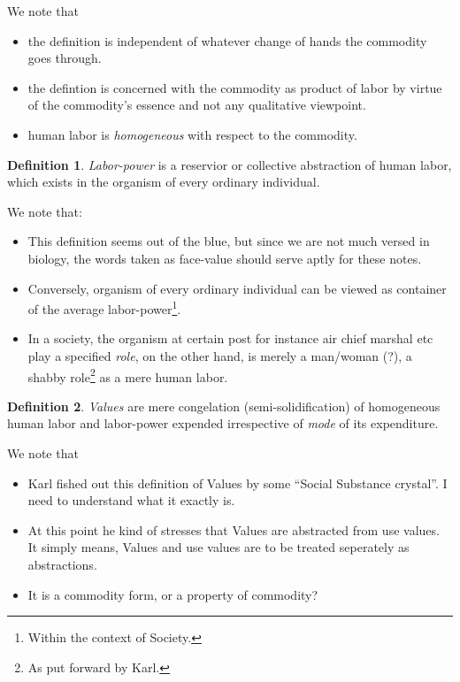 \documentclass[12pt]{extarticle}
\theoremstyle{definition}
\newtheorem{definition}{Definition}[section]
\newenvironment{remark}[1][Remark]{\begin{trivlist}
\item[\hskip \labelsep {\bfseries #1}]}{\end{trivlist}}
\begin{document}
        \begin{remark}
        We note that
        \begin{itemize}
        \item the definition is independent of whatever change of hands the commodity goes through.
        \item the defintion is concerned with the commodity as product of labor by virtue of the commodity's essence and not any qualitative viewpoint.
        \item human labor is \emph{homogeneous} with respect to the commodity.
        \end{itemize}
      \end{remark}

      \begin{definition}
        \label{def:labpow}
        \emph{Labor-power} is a reservior or collective abstraction of human labor, which exists in the organism of every ordinary individual.
      \end{definition}
      \begin{remark}
        We note that:
        \begin{itemize}
        \item This definition seems out of the blue, but since we are not much versed in biology, the words taken as face-value should serve aptly for these notes.
        \item Conversely, organism of every ordinary individual can be viewed as container of the average labor-power\footnote{Within the context of Society.}.
          \item In a society, the organism at certain post for instance air chief marshal etc play a specified \emph{role}, on the other hand, is merely a man/woman (?), a shabby role\footnote{As put forward by Karl.} as a mere human labor.
        \end{itemize}
      \end{remark}
      
      \begin{definition}
        \label{def:values}
        \emph{Values} are mere congelation (semi-solidification) of homogeneous human labor and labor-power expended irrespective of \emph{mode} of its expenditure.
      \end{definition}

      \begin{remark}
        We note that
        \begin{itemize}
        \item Karl fished out this definition of Values by some ``Social Substance crystal''.  I need to understand what it exactly is.
        \item At this point he kind of stresses that Values are abstracted from use values.  It simply means, Values and use values are to be treated seperately as abstractions.
          \item It is a commodity form, or a property of commodity?
        \end{itemize}
      \end{remark}
\end{document}
